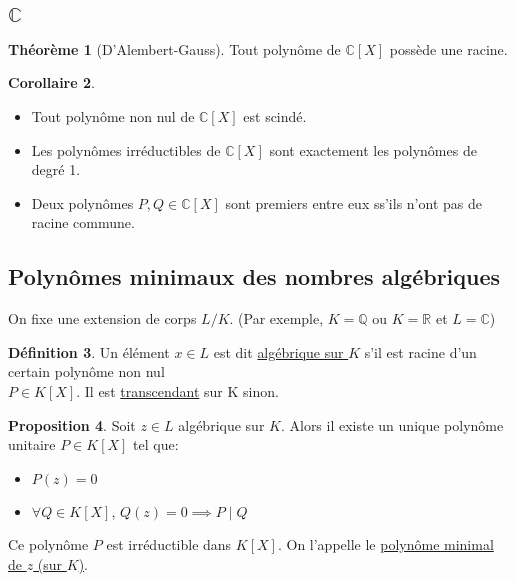 \documentclass[10pt,a4paper]{article}
\theoremstyle{definition}
\newtheorem{proposition}{Proposition}[section]
\newtheorem{theorem}[proposition]{Théorème}
\newtheorem{corollaire}[proposition]{Corollaire}
\newtheorem{definition}[proposition]{Définition}
\begin{document}
\subsection{$\mathbb{C}$}
\begin{theorem}[D'Alembert-Gauss]
Tout polynôme de $\mathbb{C}[X]$ possède une racine.
\end{theorem}
\begin{corollaire}
\hfill
\begin{itemize}
\item Tout polynôme non nul de $\mathbb{C}[X]$ est scindé.
\item Les polynômes irréductibles de $\mathbb{C}[X]$ sont exactement les polynômes de degré 1.
\item Deux polynômes $P, Q \in \mathbb{C}[X]$ sont premiers entre eux ss'ils n'ont pas de racine commune.
\end{itemize}
\end{corollaire}

\subsection{Polynômes minimaux des nombres algébriques}
On fixe une extension de corps $L / K$. (Par exemple, $K = \mathbb{Q}$ ou $K = \mathbb{R}$ et $L = \mathbb{C}$)
\begin{definition}
Un élément $x \in L$ est dit \uline{algébrique sur $K$} s'il est racine d'un certain polynôme non nul \\
$P \in K[X]$. Il est \uline{transcendant} sur K sinon.
\end{definition}
\begin{proposition}
Soit $z \in L$ algébrique sur $K$. Alors il existe un unique polynôme unitaire $P \in K[X]$ tel que:
\begin{itemize}
\item $P(z) = 0$
\item $\forall Q \in K[X]$, $Q(z) = 0 \implies P \mid Q$
\end{itemize}
Ce polynôme $P$ est irréductible dans $K[X]$. On l'appelle le \uline{polynôme minimal de $z$ (sur $K$)}.
\end{proposition}
\end{document}
